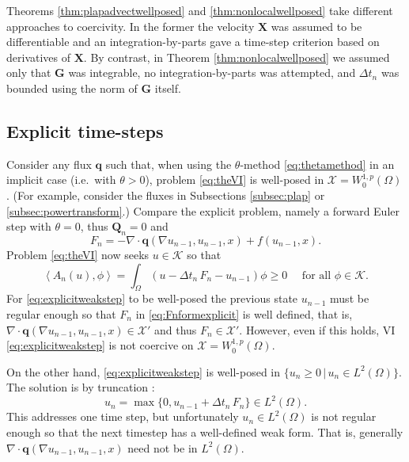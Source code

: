 \documentclass[final,onefignum]{siamart190516}
\newcommand\bq{\mathbf{q}}
\newcommand\bG{\mathbf{G}}
\newcommand\bQ{\mathbf{Q}}
\newcommand\bX{\mathbf{X}}
\newcommand{\Div}{\nabla\cdot}
\newcommand{\grad}{\nabla}
\newcommand{\ip}[2]{\ensuremath{\left<#1,#2\right>}}
\begin{document}
Theorems \ref{thm:plapadvectwellposed} and \ref{thm:nonlocalwellposed} take different approaches to coercivity.  In the former the velocity $\bX$ was assumed to be differentiable and an integration-by-parts gave a time-step criterion based on derivatives of $\bX$.  By contrast, in Theorem \ref{thm:nonlocalwellposed} we assumed only that $\bG$ was integrable, no integration-by-parts was attempted, and $\Delta t_n$ was bounded using the norm of $\bG$ itself.

\subsection{Explicit time-steps} \label{subsec:explicit}   Consider any flux $\bq$ such that, when using the $\theta$-method \eqref{eq:thetamethod} in an implicit case (i.e.~with $\theta>0$), problem \eqref{eq:theVI} is well-posed in $\mathcal{X}=W_0^{1,p}(\Omega)$.  (For example, consider the fluxes in Subsections \ref{subsec:plap} or \ref{subsec:powertransform}.)  Compare the explicit problem, namely a forward Euler step with $\theta=0$, thus $\bQ_n=0$ and
\begin{equation}
F_n = - \Div \bq(\grad u_{n-1},u_{n-1},x) + f(u_{n-1},x).  \label{eq:Fnformexplicit}
\end{equation}
Problem \eqref{eq:theVI} now seeks $u\in\mathcal{K}$ so that
\begin{equation}
\ip{A_n(u)}{\phi} = \int_\Omega (u - \Delta t_n\,F_n - u_{n-1})\phi \ge 0 \quad \text{ for all } \phi \in \mathcal{K}.  \label{eq:explicitweakstep}
\end{equation}
For \eqref{eq:explicitweakstep} to be well-posed the previous state $u_{n-1}$ must be regular enough so that $F_n$ in \eqref{eq:Fnformexplicit} is well defined, that is, $\Div \bq(\grad u_{n-1},u_{n-1},x) \in \mathcal{X}'$ and thus $F_n\in\mathcal{X}'$.  However, even if this holds, VI \eqref{eq:explicitweakstep} is not coercive on $\mathcal{X}=W_0^{1,p}(\Omega)$.

On the other hand, \eqref{eq:explicitweakstep} is well-posed in $\{u_n\ge 0\,\big|\,u_n\in L^2(\Omega)\}$.  The solution is by truncation \cite[page 27]{KinderlehrerStampacchia1980}:
\begin{equation}
u_n = \max\{0,u_{n-1} + \Delta t_n\,F_n\} \in L^2(\Omega). \label{eq:explicittruncation}
\end{equation}
This addresses one time step, but unfortunately $u_n \in L^2(\Omega)$ is not regular enough so that the next timestep has a well-defined weak form.  That is, generally $\Div \bq(\grad u_{n-1},u_{n-1},x)$ need not be in $L^2(\Omega)$.
\end{document}
